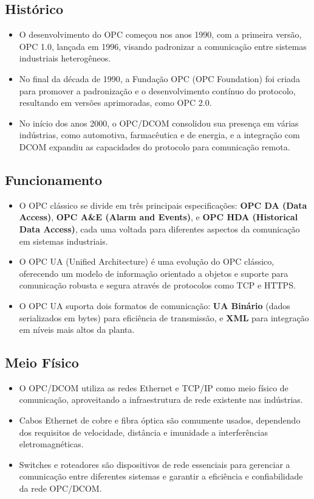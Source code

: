 \documentclass[a4paper,11pt]{article} %
\begin{document}
\subsection{Histórico}
\begin{itemize}
    \item O desenvolvimento do OPC começou nos anos 1990, com a primeira versão, OPC 1.0, lançada em 1996, visando padronizar a comunicação entre sistemas industriais heterogêneos.
    \item No final da década de 1990, a Fundação OPC (OPC Foundation) foi criada para promover a padronização e o desenvolvimento contínuo do protocolo, resultando em versões aprimoradas, como OPC 2.0.
    \item No início dos anos 2000, o OPC/DCOM consolidou sua presença em várias indústrias, como automotiva, farmacêutica e de energia, e a integração com DCOM expandiu as capacidades do protocolo para comunicação remota.
\end{itemize}

\subsection{Funcionamento}
\begin{itemize}
    \item O OPC clássico se divide em três principais especificações: \textbf{OPC DA (Data Access)}, \textbf{OPC A\&E (Alarm and Events)}, e \textbf{OPC HDA (Historical Data Access)}, cada uma voltada para diferentes aspectos da comunicação em sistemas industriais.
    \item O OPC UA (Unified Architecture) é uma evolução do OPC clássico, oferecendo um modelo de informação orientado a objetos e suporte para comunicação robusta e segura através de protocolos como TCP e HTTPS.
    \item O OPC UA suporta dois formatos de comunicação: \textbf{UA Binário} (dados serializados em bytes) para eficiência de transmissão, e \textbf{XML} para integração em níveis mais altos da planta.
\end{itemize}

\subsection{Meio Físico}
\begin{itemize}
    \item O OPC/DCOM utiliza as redes Ethernet e TCP/IP como meio físico de comunicação, aproveitando a infraestrutura de rede existente nas indústrias.
    \item Cabos Ethernet de cobre e fibra óptica são comumente usados, dependendo dos requisitos de velocidade, distância e imunidade a interferências eletromagnéticas.
    \item Switches e roteadores são dispositivos de rede essenciais para gerenciar a comunicação entre diferentes sistemas e garantir a eficiência e confiabilidade da rede OPC/DCOM.
\end{itemize}
\end{document}
